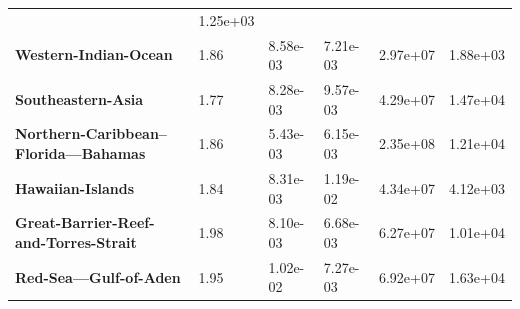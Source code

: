 \begin{table}[H]
{\begin{tabular}{llllll}
                                                                & 1.25e+03
            \\
            \textbf{Western-Indian-Ocean}                       & 1.86
                                                                & 8.58e-03
                                                                & 7.21e-03
                                                                & 2.97e+07
                                                                & 1.88e+03
            \\
            \textbf{Southeastern-Asia}                          & 1.77
                                                                & 8.28e-03
                                                                & 9.57e-03
                                                                & 4.29e+07
                                                                & 1.47e+04
            \\
            \textbf{Northern-Caribbean--Florida---Bahamas}      & 1.86
                                                                & 5.43e-03
                                                                &
            6.15e-03                                            & 2.35e+08
                                                                & 1.21e+04
            \\
            \textbf{Hawaiian-Islands}                           & 1.84
                                                                & 8.31e-03
                                                                & 1.19e-02
                                                                & 4.34e+07
                                                                & 4.12e+03
            \\
            \textbf{Great-Barrier-Reef-and-Torres-Strait}       & 1.98
                                                                & 8.10e-03
                                                                &
            6.68e-03                                            & 6.27e+07
                                                                & 1.01e+04
            \\
            \textbf{Red-Sea---Gulf-of-Aden}                     & 1.95
                                                                & 1.02e-02
                                                                & 7.27e-03
                                                                & 6.92e+07
                                                                & 1.63e+04

\end{tabular}}
\end{table}
